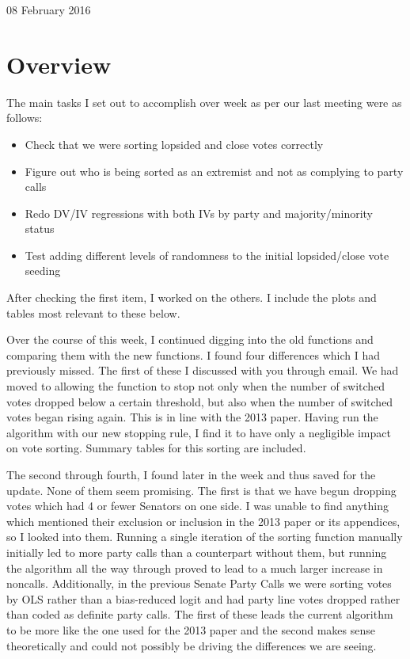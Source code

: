 \documentclass[12pt]{article}
\begin{document}
\begin{center}
\Large 08 February 2016
\end{center}

\section{Overview}

The main tasks I set out to accomplish over week as per our last meeting were as follows:

\begin{itemize}
	\item Check that we were sorting lopsided and close votes correctly
	
	\item Figure out who is being sorted as an extremist and not as complying to party calls
	
	\item Redo DV/IV regressions with both IVs by party and majority/minority status
	
	\item Test adding different levels of randomness to the initial lopsided/close vote seeding
\end{itemize}

\noindent
After checking the first item, I worked on the others. I include the plots and tables most relevant to these below.

Over the course of this week, I continued digging into the old functions and comparing them with the new functions. I found four differences which I had previously missed. The first of these I discussed with you through email. We had moved to allowing the function to stop not only when the number of switched votes dropped below a certain threshold, but also when the number of switched votes began rising again. This is in line with the 2013 paper. Having run the algorithm with our new stopping rule, I find it to have only a negligible impact on vote sorting. Summary tables for this sorting are included.

The second through fourth, I found later in the week and thus saved for the update. None of them seem promising. The first is that we have begun dropping votes which had 4 or fewer Senators on one side. I was unable to find anything which mentioned their exclusion or inclusion in the 2013 paper or its appendices, so I looked into them. Running a single iteration of the sorting function manually initially led to more party calls than a counterpart without them, but running the algorithm all the way through proved to lead to a much larger increase in noncalls. Additionally, in the previous Senate Party Calls we were sorting votes by OLS rather than a bias-reduced logit and had party line votes dropped rather than coded as definite party calls. The first of these leads the current algorithm to be more like the one used for the 2013 paper and the second makes sense theoretically and could not possibly be driving the differences we are seeing.
\end{document}
